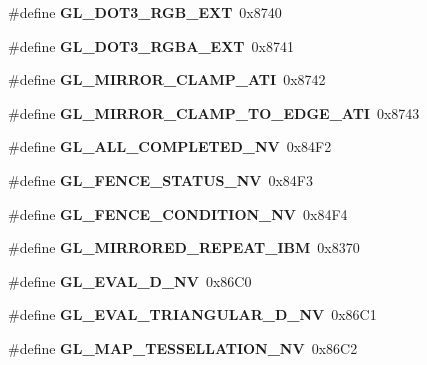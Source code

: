 \begin{DoxyCompactItemize}
\item 
\#define {\bfseries G\+L\+\_\+\+D\+O\+T3\+\_\+\+R\+G\+B\+\_\+\+E\+X\+T}~0x8740\label{_s_d_l__opengl_8h_ad804c64ee77baeb1713dd2c5c416db30}

\item 
\#define {\bfseries G\+L\+\_\+\+D\+O\+T3\+\_\+\+R\+G\+B\+A\+\_\+\+E\+X\+T}~0x8741\label{_s_d_l__opengl_8h_acf539358f110d68224eca4dced619a10}

\item 
\#define {\bfseries G\+L\+\_\+\+M\+I\+R\+R\+O\+R\+\_\+\+C\+L\+A\+M\+P\+\_\+\+A\+T\+I}~0x8742\label{_s_d_l__opengl_8h_ae67e7cf5a7fac4c02892bc10b07ca090}

\item 
\#define {\bfseries G\+L\+\_\+\+M\+I\+R\+R\+O\+R\+\_\+\+C\+L\+A\+M\+P\+\_\+\+T\+O\+\_\+\+E\+D\+G\+E\+\_\+\+A\+T\+I}~0x8743\label{_s_d_l__opengl_8h_a1d4bb0e3aaeb94e757a301235eeed323}

\item 
\#define {\bfseries G\+L\+\_\+\+A\+L\+L\+\_\+\+C\+O\+M\+P\+L\+E\+T\+E\+D\+\_\+\+N\+V}~0x84\+F2\label{_s_d_l__opengl_8h_af898aac1ca2402680749e3dbe8cf94a5}

\item 
\#define {\bfseries G\+L\+\_\+\+F\+E\+N\+C\+E\+\_\+\+S\+T\+A\+T\+U\+S\+\_\+\+N\+V}~0x84\+F3\label{_s_d_l__opengl_8h_ab7fc7646ef3948e81380a5db1d2728b0}

\item 
\#define {\bfseries G\+L\+\_\+\+F\+E\+N\+C\+E\+\_\+\+C\+O\+N\+D\+I\+T\+I\+O\+N\+\_\+\+N\+V}~0x84\+F4\label{_s_d_l__opengl_8h_afc2a41db7ed2cda1d7dd1785b31338d4}

\item 
\#define {\bfseries G\+L\+\_\+\+M\+I\+R\+R\+O\+R\+E\+D\+\_\+\+R\+E\+P\+E\+A\+T\+\_\+\+I\+B\+M}~0x8370\label{_s_d_l__opengl_8h_ac22ff9e6c5573a2be2d97da145cb5a19}

\item 
\#define {\bfseries G\+L\+\_\+\+E\+V\+A\+L\+\_\+D\+\_\+\+N\+V}~0x86\+C0\label{_s_d_l__opengl_8h_af4d47cad474433a651c08b0a23def87e}

\item 
\#define {\bfseries G\+L\+\_\+\+E\+V\+A\+L\+\_\+\+T\+R\+I\+A\+N\+G\+U\+L\+A\+R\+\_\+D\+\_\+\+N\+V}~0x86\+C1\label{_s_d_l__opengl_8h_a94e66225ef3be6d7080efc967b7975f0}

\item 
\#define {\bfseries G\+L\+\_\+\+M\+A\+P\+\_\+\+T\+E\+S\+S\+E\+L\+L\+A\+T\+I\+O\+N\+\_\+\+N\+V}~0x86\+C2\label{_s_d_l__opengl_8h_a96ae91e6c7098faa0ea56be81949f8e4}


\end{DoxyCompactItemize}

